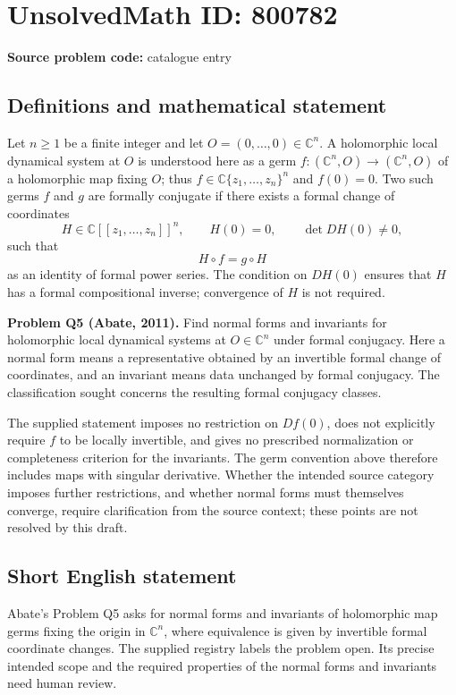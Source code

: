 \documentclass[11pt]{article}
\newcommand{\C}{\mathbb{C}}
\begin{document}
\section*{UnsolvedMath ID: 800782}
\textbf{Source problem code:} catalogue entry
\subsection{Definitions and mathematical statement}
Let \(n\geq 1\) be a finite integer and let \(O=(0,\ldots,0)\in\C^n\). A holomorphic local dynamical system at \(O\) is understood here as a germ \(f:(\C^n,O)\to(\C^n,O)\) of a holomorphic map fixing \(O\); thus \(f\in\C\{z_1,\ldots,z_n\}^n\) and \(f(0)=0\). Two such germs \(f\) and \(g\) are formally conjugate if there exists a formal change of coordinates
\[
H\in\C[[z_1,\ldots,z_n]]^n,\qquad H(0)=0,\qquad \det DH(0)\ne0,
\]
such that
\[
H\circ f=g\circ H
\]
as an identity of formal power series. The condition on \(DH(0)\) ensures that \(H\) has a formal compositional inverse; convergence of \(H\) is not required.

\textbf{Problem Q5 (Abate, 2011).} Find normal forms and invariants for holomorphic local dynamical systems at \(O\in\C^n\) under formal conjugacy. Here a normal form means a representative obtained by an invertible formal change of coordinates, and an invariant means data unchanged by formal conjugacy. The classification sought concerns the resulting formal conjugacy classes.

The supplied statement imposes no restriction on \(Df(0)\), does not explicitly require \(f\) to be locally invertible, and gives no prescribed normalization or completeness criterion for the invariants. The germ convention above therefore includes maps with singular derivative. Whether the intended source category imposes further restrictions, and whether normal forms must themselves converge, require clarification from the source context; these points are not resolved by this draft.
\subsection{Short English statement}
Abate's Problem Q5 asks for normal forms and invariants of holomorphic map germs fixing the origin in \(\C^n\), where equivalence is given by invertible formal coordinate changes. The supplied registry labels the problem open. Its precise intended scope and the required properties of the normal forms and invariants need human review.
\end{document}
